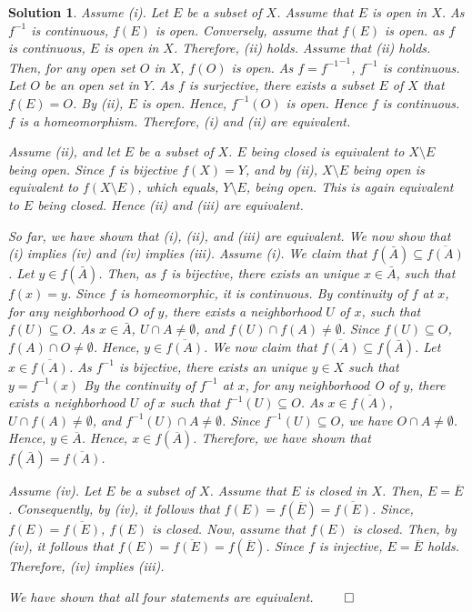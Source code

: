 \documentclass{article} %
\theoremstyle{quest}
\newtheorem*{solution}{Solution}
\begin{document}
\begin{solution}
Assume (i). Let $E$ be a subset of $X$. 
Assume that $E$ is open in $X$. As $f^{-1}$ is continuous, $f(E)$
is open. Conversely, assume that $f(E)$ is open. as $f$ is continuous,
$E$ is open in $X$. Therefore, (ii) holds.
Assume that (ii) holds. Then, for
any open set $O$ in $X$, $f(O)$ is open. As $f = {f^{-1}}^{-1}$,
$f^{-1}$ is continuous. 
Let $O$ be an open set in $Y$. As $f$ is surjective, there exists 
a subset $E$ of $X$ that $f(E) = O$. By (ii), $E$ is open. Hence,
$f^{-1}(O)$ is open. Hence $f$ is continuous. $f$ is a homeomorphism. 
Therefore, (i) and (ii) are equivalent.  

\bigskip

Assume (ii), and let $E$ be a subset of $X$. $E$ being closed is 
equivalent to $X \setminus E$ being open. Since $f$ is bijective
$f(X) = Y$, and by (ii), $X \setminus E$ being open is equivalent
to $f(X \setminus E)$, which equals, $Y \setminus E$, being open. 
This is again equivalent to $E$ being closed. Hence (ii) and (iii)
are equivalent. 
 
\bigskip

So far, we have shown that (i), (ii), and (iii) are equivalent. We now 
show that (i) implies (iv) and (iv) implies (iii). 
Assume (i). We claim that $f(\bar{A}) \subseteq \overline{f(A)}$. Let
$y \in f(\bar{A})$. Then, as $f$ is bijective, there exists 
an unique $x \in \bar{A}$, such that
$f(x) = y$. Since $f$ is homeomorphic, it is continuous. 
By continuity of $f$ at $x$, for any neighborhood $O$
of $y$, there exists a neighborhood $U$ of $x$, such that $f(U) \subseteq 
O$. As $x \in \bar{A}$, $U \cap A \neq \emptyset$, and $f(U) \cap f(A) 
\neq \emptyset$. Since $f(U) \subseteq O$, $f(A) \cap O \neq \emptyset$. 
Hence, $y \in \overline{f(A)}$. We now claim that
$\overline{f(A)} \subseteq f(\bar{A})$. Let $x \in \overline{f(A)}$.
As $f^{-1}$ is bijective, there exists an unique $y \in X$ such that
$y = f^{-1}(x)$ By the continuity of $f^{-1}$ at $x$, for any neighborhood 
O of $y$, there exists a neighborhood $U$ of $x$ such that $f^{-1}(U)
\subseteq O$. As $x \in \overline{f(A)}$, $U \cap f(A) \neq \emptyset$,
and $f^{-1}(U) \cap A \neq \emptyset$. Since $f^{-1}(U) \subseteq
O$, we have $O \cap A \neq \emptyset$. Hence, $y \in \overline{A}$. 
Hence, $x \in f(\overline{A})$. Therefore, we have shown that
$f(\bar{A}) = \overline{f(A)}$. 

\smallskip

Assume (iv). Let $E$ be a subset of $X$. Assume that $E$ is closed in $X$.
Then, $E = \overline{E}$. Consequently, by (iv), it follows that $f(E) = f(
\overline{E}) = \overline{f(E)}$. Since, $f(E) = \overline{f(E)}$, 
$f(E)$ is closed.  Now, assume that $f(E)$ is closed. Then, by (iv), 
it follows that $f(E) = \overline{f(E)} = f(\overline{E})$. Since $f$
is injective, $E = \overline{E}$ holds. Therefore, (iv) implies (iii). 

\bigskip

We have shown that all four statements are equivalent. \hfill $\qed$
\end{solution}
\end{document}

